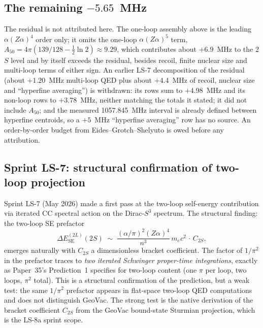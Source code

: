 \documentclass[11pt]{article}
\begin{document}
\subsection{The remaining $-5.65$~MHz}
\label{sec:residual}

The residual is not attributed here.  The one-loop assembly above is the
leading $\alpha(Z\alpha)^4$ order only; it omits the one-loop
$\alpha(Z\alpha)^5$ term, $A_{50} = 4\pi(139/128 - \tfrac12\ln 2)
\approx 9.29$, which contributes about $+6.9$~MHz to the 2$S$ level and
by itself exceeds the residual, besides recoil, finite nuclear size and
multi-loop terms of either sign.  An earlier LS-7 decomposition of the
residual (about $+1.20$~MHz multi-loop QED plus about $+4.4$~MHz of
recoil, nuclear size and ``hyperfine averaging'') is withdrawn: its
rows sum to $+4.98$~MHz and its non-loop rows to $+3.78$~MHz, neither
matching the totals it stated; it did not include $A_{50}$; and the
measured 1057.845~MHz interval is already defined between hyperfine
centroids, so a $+5$~MHz ``hyperfine averaging'' row has no source.  An
order-by-order budget from Eides--Grotch--Shelyuto is owed before any
attribution.

\subsection{Sprint LS-7: structural confirmation of two-loop projection}

Sprint LS-7 (May 2026) made a first pass at the two-loop self-energy
contribution via iterated CC spectral action on the Dirac-$S^3$
spectrum.  The structural finding: the two-loop SE prefactor
\begin{equation}
\label{eq:two_loop_prefactor}
\Delta E^{(2L)}_\text{SE}(2S) \;\sim\; \frac{(\alpha/\pi)^2 (Z\alpha)^4}{n^3}\, m_e c^2 \,\cdot\, C_{2S},
\end{equation}
emerges naturally with $C_{2S}$ a dimensionless bracket coefficient.
The factor of $1/\pi^2$ in the prefactor traces to \emph{two iterated
Schwinger proper-time integrations}, exactly as Paper~35's
Prediction~1 specifies for two-loop content (one $\pi$ per loop, two
loops, $\pi^2$ total).  This is a structural confirmation of the
prediction, but a weak test: the same $1/\pi^2$ prefactor appears in
flat-space two-loop QED computations and does not distinguish
GeoVac.  The strong test is the native derivation of the bracket
coefficient $C_{2S}$ from the GeoVac bound-state Sturmian projection,
which is the LS-8a sprint scope.
\end{document}
